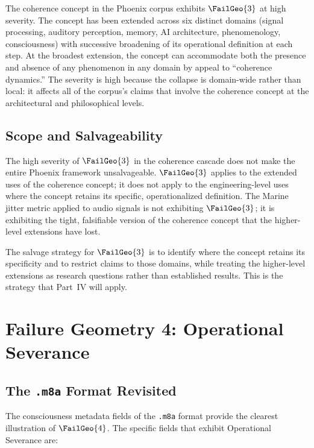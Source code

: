 \begin{auditprop}
\label{ap:fg3-coherence}
The coherence concept in the Phoenix corpus exhibits
$\FailGeo{3}$ at high severity. The concept has been
extended across six distinct domains (signal processing,
auditory perception, memory, AI architecture, phenomenology,
consciousness) with successive broadening of its
operational definition at each step. At the broadest
extension, the concept can accommodate both the presence
and absence of any phenomenon in any domain by appeal
to ``coherence dynamics.'' The severity is high because
the collapse is domain-wide rather than local: it affects
all of the corpus's claims that involve the coherence
concept at the architectural and philosophical levels.
\end{auditprop}

\subsection{Scope and Salvageability}

The high severity of $\FailGeo{3}$ in the coherence
cascade does not make the entire Phoenix framework
unsalvageable. $\FailGeo{3}$ applies to the extended
uses of the coherence concept; it does not apply to
the engineering-level uses where the concept retains
its specific, operationalized definition. The Marine
jitter metric applied to audio signals is not exhibiting
$\FailGeo{3}$; it is exhibiting the tight, falsifiable
version of the coherence concept that the higher-level
extensions have lost.

The salvage strategy for $\FailGeo{3}$ is to identify
where the concept retains its specificity and to
restrict claims to those domains, while treating the
higher-level extensions as research questions rather
than established results. This is the strategy that
Part~IV will apply.

\section{Failure Geometry 4: Operational Severance}
\label{sec:fg4-analysis}

\subsection{The \texttt{.m8a} Format Revisited}

The consciousness metadata fields of the \texttt{.m8a}
format provide the clearest illustration of $\FailGeo{4}$.
The specific fields that exhibit Operational Severance are:

